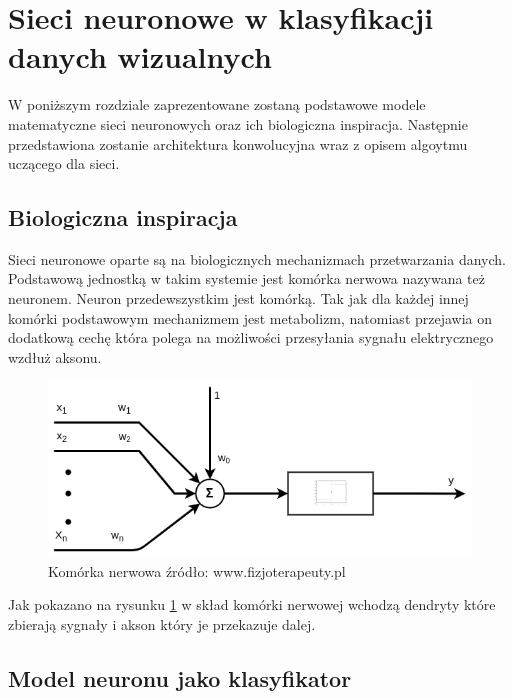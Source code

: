 \documentclass{article}
\begin{document}
\section{Sieci neuronowe w klasyfikacji danych wizualnych}
W poniższym rozdziale zaprezentowane zostaną podstawowe modele matematyczne sieci neuronowych
oraz ich biologiczna inspiracja. Następnie przedstawiona zostanie architektura konwolucyjna wraz
z opisem algoytmu uczącego dla sieci.

\subsection{Biologiczna inspiracja}
Sieci neuronowe oparte są na biologicznych mechanizmach przetwarzania danych. Podstawową jednostką
w takim systemie jest komórka nerwowa \cite{Tadeusiewicz1994} nazywana też neuronem.
Neuron przedewszystkim jest komórką. Tak jak dla każdej innej komórki podstawowym mechanizmem jest
metabolizm, natomiast przejawia on dodatkową cechę która polega na możliwości przesyłania sygnału
elektrycznego wzdłuż aksonu.
\begin{figure}[htb] 
	\label{fig:neuron}
	\centering
	\includegraphics[width=\textwidth]{figures/neuron}
	\caption{Komórka nerwowa \tiny{źródło: www.fizjoterapeuty.pl}}
\end{figure}
Jak pokazano na rysunku \ref{fig:neuron} w skład komórki nerwowej wchodzą dendryty które zbierają
sygnały i akson który je przekazuje dalej.

\FloatBarrier
\subsection{Model neuronu jako klasyfikator}

\end{document}
